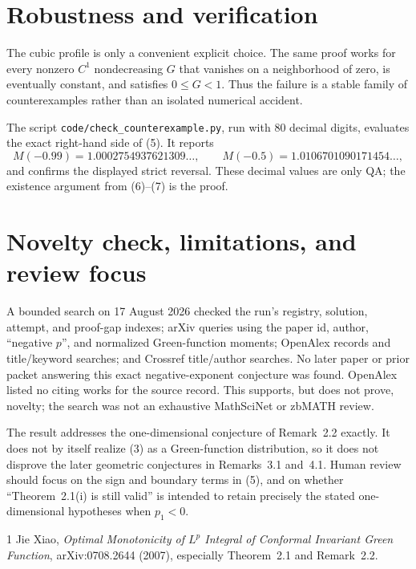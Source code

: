 \documentclass[11pt]{article}
\begin{document}
\section{Robustness and verification}

The cubic profile is only a convenient explicit choice.  The same proof works
for every nonzero \(C^1\) nondecreasing \(G\) that vanishes on a neighborhood
of zero, is eventually constant, and satisfies \(0\leq G<1\).  Thus the
failure is a stable family of counterexamples rather than an isolated
numerical accident.

The script \texttt{code/check\_counterexample.py}, run with 80 decimal digits,
evaluates the exact right-hand side of (5).  It reports
\[
 M(-0.99)=1.0002754937621309\ldots,
 \qquad
 M(-0.5)=1.0106701090171454\ldots,
\]
and confirms the displayed strict reversal.  These decimal values are only
QA; the existence argument from (6)--(7) is the proof.

\section{Novelty check, limitations, and review focus}

A bounded search on 17 August 2026 checked the run's registry, solution,
attempt, and proof-gap indexes; arXiv queries using the paper id, author,
``negative \(p\)'', and normalized Green-function moments; OpenAlex records
and title/keyword searches; and Crossref title/author searches.  No later
paper or prior packet answering this exact negative-exponent conjecture was
found.  OpenAlex listed no citing works for the source record.  This supports,
but does not prove, novelty; the search was not an exhaustive MathSciNet or
zbMATH review.

The result addresses the one-dimensional conjecture of Remark~2.2 exactly.
It does not by itself realize (3) as a Green-function distribution, so it does
not disprove the later geometric conjectures in Remarks~3.1 and~4.1.  Human
review should focus on the sign and boundary terms in (5), and on whether
``Theorem~2.1(i) is still valid'' is intended to retain precisely the stated
one-dimensional hypotheses when \(p_1<0\).

\begin{thebibliography}{1}
Jie Xiao,
\emph{Optimal Monotonicity of \(L^p\) Integral of Conformal Invariant Green
Function}, arXiv:0708.2644 (2007), especially Theorem~2.1 and Remark~2.2.
\end{thebibliography}
\end{document}
